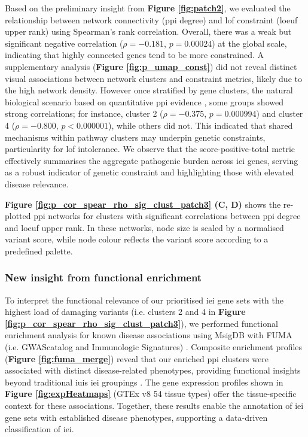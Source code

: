 Based on the preliminary insight from \textbf{Figure \ref{fig:patch2}},
we evaluated the relationship between network connectivity (\ac{ppi} degree) and \ac{lof} constraint (\ac{loeuf} upper rank) \citet{karczewski2020mutational} using Spearman’s rank correlation.
Overall, there was a weak but significant negative correlation ($\rho = -0.181$, $p = 0.00024$) at the global scale, indicating that highly connected genes tend to be more constrained. 
A supplementary analysis (\textbf{Figure \ref{fig:p_umap_const}})
did not reveal distinct visual associations between network clusters and constraint metrics, likely due to the high network density. 
However once stratified by gene clusters, the natural biological scenario based on quantitative \ac{ppi} evidence \cite{szklarczyk2025string},
some groups showed strong correlations; for instance, cluster 2 ($\rho = -0.375$, $p = 0.000994$) and cluster 4 ($\rho = -0.800$, $p < 0.000001$), while others did not.
This indicated that shared mechanisms within pathway clusters may underpin genetic constraints, particularity for \ac{lof} intolerance. We observe that the score-positive-total metric effectively summarises the aggregate pathogenic burden across \ac{iei} genes, serving as a robust indicator of genetic constraint and highlighting those with elevated disease relevance.


\textbf{Figure \ref{fig:p_cor_spear_rho_sig_clust_patch3} (C, D)} shows the re-plotted \ac{ppi} networks for clusters with significant correlations between \ac{ppi} degree and \ac{loeuf} upper rank. In these networks, node size is scaled by a normalised variant score, while node colour reflects the variant score according to a predefined palette.

\subsubsection{New insight from functional enrichment}
To interpret the functional relevance of our prioritised \ac{iei} gene sets with the highest load of damaging variants (i.e. clusters 2 and 4 in \textbf{Figure \ref{fig:p_cor_spear_rho_sig_clust_patch3}}), we performed functional enrichment analysis for known disease associations using MsigDB with FUMA (i.e. GWAScatalog and Immunologic Signatures) \cite{watanabe_functional_2017}. Composite enrichment profiles (\textbf{Figure \ref{fig:fuma_merge}}) reveal that our enriched \ac{ppi} clusters were associated with distinct disease-related phenotypes, providing functional insights beyond traditional \ac{iuis} \ac{iei} groupings \cite{poli_human_2025}. The gene expression profiles shown in \textbf{Figure \ref{fig:expHeatmaps}} (GTEx v8 54 tissue types) offer the tissue-specific context for these associations. Together, these results enable the annotation of \ac{iei} gene sets with established disease phenotypes, supporting a data-driven classification of \ac{iei}.

